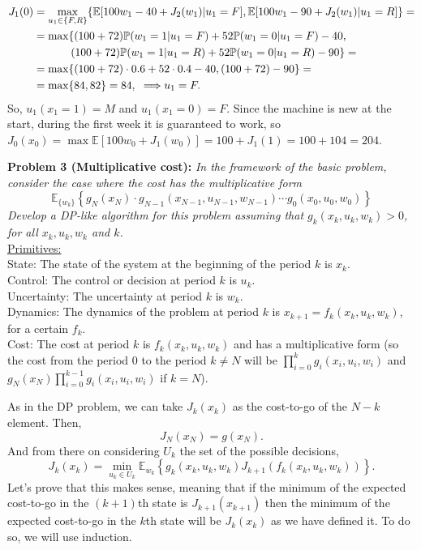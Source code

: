 \documentclass[11pt, english]{article}
\begin{document}
\begin{align}
J_1(0)&=\underset{u_1\in\{F,R\}}{\max}\{\mathbb{E}[100w_1-40+J_2(w_1)|u_1=F],\mathbb{E}[100w_1-90+J_2(w_1)|u_1=R]\}=\\
&=\max\{(100+72)\mathbb{P}(w_1=1|u_1=F)+52\mathbb{P}(w_1=0|u_1=F)-40,\\
&\hspace{12mm}(100+72)\mathbb{P}(w_1=1|u_1=R)+52\mathbb{P}(w_1=0|u_1=R)-90\}=\\
&=\max\{(100+72)\cdot 0.6+52\cdot 0.4-40,(100+72)-90\}=\\
&=\max\{84,82\}=84,\text{ }\Longrightarrow u_1=F.
\end{align}
So, $u_1(x_1=1)=M$ and $u_1(x_1=0)=F$. Since the machine is new at the start, during the first week it is guaranteed to work, so $J_0(x_0)=\max\mathbb{E}[100w_0+J_1(w_0)]=100+J_1(1)=100+104=204$.




\textbf{Problem 3 (Multiplicative cost):}\textit{ In the framework of the basic problem, consider the case where the cost has the multiplicative form}
$$\mathbb{E}_{\{w_k\}}\left\{g_N(x_N)\cdot g_{N-1}(x_{N-1},u_{N-1},w_{N-1})\cdots g_0(x_0,u_0,w_0) \right\}$$
\textit{Develop a DP-like algorithm for this problem assuming that $g_k(x_k,u_k,w_k)>0$, for all $x_k,u_k,w_k$ and $k$.}\\
\underline{Primitives:}\\
State: The state of the system at the beginning of the period $k$ is $x_k$.\\
Control: The control or decision at period $k$ is $u_k$.\\
Uncertainty: The uncertainty at period $k$ is $w_k$.\\
Dynamics: The dynamics of the problem at period $k$ is $x_{k+1}=f_k(x_k,u_k,w_k)$, for a certain $f_k$.\\
Cost: The cost at period $k$ is $f_k(x_k,u_k,w_k)$ and has a multiplicative form (so the cost from the period 0 to the period $k\neq N$ will be $\prod\limits_{i=0}^k g_i(x_i,u_i,w_i)$ and $g_N(x_N)\prod\limits_{i=0}^{k-1} g_i(x_i,u_i,w_i)$ if $k=N$).
 
As in the DP problem, we can take $J_k(x_k)$ as the cost-to-go of the $N-k$ element. Then, 
$$J_N(x_N)=g(x_N).$$
And from there on considering $U_k$ the set of the possible decisions,
$$J_{k}(x_k)=\underset{u_k\in U_k}{\min}\mathbb{E}_{w_k}\left\{g_k(x_k,u_k,w_k)J_{k+1}(f_k(x_k,u_k,w_k))\right\}.$$
Let's prove that this makes sense, meaning that if the minimum of the expected cost-to-go in the $(k+1)$th state is $J_{k+1}(x_{k+1})$ then the minimum of the expected cost-to-go in the $k$th state will be $J_k(x_k)$ as we have defined it. To do so, we will use induction. \\
\end{document}
